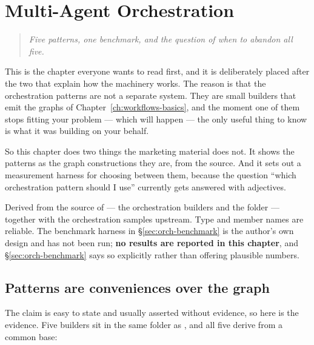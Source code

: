 \chapter{Multi-Agent Orchestration}
\label{ch:orchestration}

\begin{quote}\itshape
Five patterns, one benchmark, and the question of when to abandon all five.
\end{quote}

\noindent
This is the chapter everyone wants to read first, and it is deliberately placed
after the two that explain how the machinery works. The reason is that the
orchestration patterns are not a separate system. They are small builders that
emit the graphs of Chapter~\ref{ch:workflows-basics}, and the moment one of them
stops fitting your problem --- which will happen --- the only useful thing to
know is what it was building on your behalf.

So this chapter does two things the marketing material does not. It shows the
patterns as the graph constructions they are, from the source. And it sets out a
measurement harness for choosing between them, because the question ``which
orchestration pattern should I use'' currently gets answered with adjectives.

\begin{verifybox}
Derived from the source of  --- the
orchestration builders and the  folder --- together with the
orchestration samples upstream. Type and member names are reliable. The benchmark
harness in \S\ref{sec:orch-benchmark} is the author's own design and has not been
run; \textbf{no results are reported in this chapter}, and \S\ref{sec:orch-benchmark}
says so explicitly rather than offering plausible numbers.
\end{verifybox}

\section{Patterns are conveniences over the graph}
\label{sec:orch-conveniences}

The claim is easy to state and usually asserted without evidence, so here is the
evidence. Five builders sit in the same folder as , and all
five derive from a common base:

